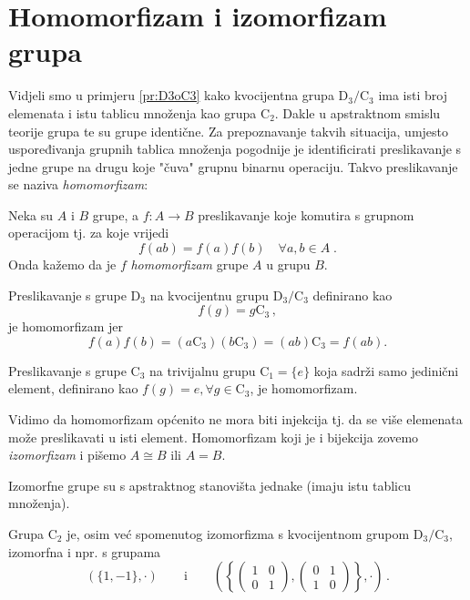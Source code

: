 \section{Homomorfizam i izomorfizam grupa}

Vidjeli smo u primjeru \ref{pr:D3oC3} kako kvocijentna grupa $\mathrm{D}_3/\mathrm{C}_3$
ima isti broj elemenata i istu tablicu množenja kao grupa $\mathrm{C}_2$. Dakle u
apstraktnom smislu teorije grupa te su grupe identične.  Za prepoznavanje takvih
situacija, umjesto uspoređivanja grupnih tablica množenja pogodnije je identificirati
preslikavanje s jedne grupe na drugu koje "čuva" grupnu binarnu operaciju. Takvo preslikavanje
se naziva \emph{homomorfizam}:
\begin{definicija}[Homomorfizam]
Neka su $A$ i $B$ grupe, a $f:A\to B$ preslikavanje koje komutira
s grupnom operacijom tj. za koje vrijedi
\begin{displaymath}
      f(ab)=f(a)f(b) \quad \forall a,b\in A \;.
\end{displaymath}
Onda kažemo da je $f$ \emph{homomorfizam} grupe $A$ u grupu $B$.
\end{definicija}

\begin{primjer}
    Preslikavanje s grupe $\mathrm{D}_3$ na kvocijentnu grupu
    $\mathrm{D}_3/\mathrm{C}_3$ definirano kao 
    \[
        f(g) = g\mathrm{C}_3 \,,
    \] je homomorfizam jer
    \[
        f(a) f(b) = (a \mathrm{C}_3) (b \mathrm{C}_3 ) =
        (a b) \mathrm{C}_3 = f(a b)
    .\] 
\end{primjer}
\begin{primjer}
    Preslikavanje s grupe $\mathrm{C}_3$ na trivijalnu grupu $\mathrm{C}_1 = \{e\}$
    koja sadrži samo jedinični element, definirano kao $f(g) = e,
    \forall g\in\mathrm{C}_3$, je homomorfizam.
    \label{pr:C3toC1}
\end{primjer}

Vidimo da homomorfizam općenito ne mora biti injekcija tj. da se više
elemenata može preslikavati u isti element.
Homomorfizam koji je i bijekcija zovemo \emph{izomorfizam} i
pišemo $A\cong B$ ili $A=B$.

Izomorfne grupe su s apstraktnog stanovišta jednake (imaju
istu tablicu množenja).

\begin{primjer}
Grupa C$_2$ je, osim već spomenutog izomorfizma s
kvocijentnom grupom $\mathrm{D}_3/\mathrm{C}_3$, izomorfna i
npr. s grupama 
$$
(\{1, -1\},\cdot) \qquad \text{i} \qquad \left(\left\{
\begin{pmatrix}
1 & 0 \\ 0 & 1
\end{pmatrix},
\begin{pmatrix}
0 & 1 \\ 1 & 0
\end{pmatrix}
\right\},\cdot\right)\,.$$
\end{primjer}

